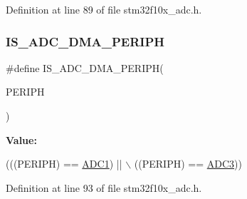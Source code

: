 Definition at line 89 of file stm32f10x\+\_\+adc.\+h.

\mbox{\label{group___a_d_c___exported___constants_ga56ce1703cee9a93969fc507b985ee949}} 
\subsubsection{\texorpdfstring{I\+S\+\_\+\+A\+D\+C\+\_\+\+D\+M\+A\+\_\+\+P\+E\+R\+I\+PH}{IS\_ADC\_DMA\_PERIPH}}
{\footnotesize\ttfamily \#define I\+S\+\_\+\+A\+D\+C\+\_\+\+D\+M\+A\+\_\+\+P\+E\+R\+I\+PH(\begin{DoxyParamCaption}\item[{}]{P\+E\+R\+I\+PH }\end{DoxyParamCaption})}

{\bfseries Value\+:}
\begin{DoxyCode}
(((PERIPH) == \hyperlink{group___peripheral__declaration_ga90d2d5c526ce5c0a551f533eccbee71a}{ADC1}) || \(\backslash\)
                                   ((PERIPH) == \hyperlink{group___peripheral__declaration_gae917784606daf6b04c9b7b96b40c2f74}{ADC3}))
\end{DoxyCode}


Definition at line 93 of file stm32f10x\+\_\+adc.\+h.

